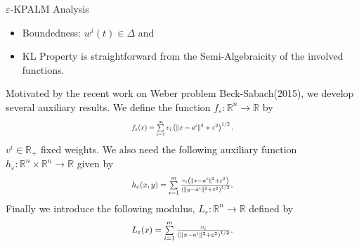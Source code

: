 \documentclass[9pt,handout]{beamer} %
\newenvironment{displaybox}[1]
{
  \centerline\bgroup\hfill
  \begin{beamerboxesrounded}[lower=default,shadow=true,width=#1]{}
}
{
  \end{beamerboxesrounded}\hfill\egroup
}
\newcommand{\rr}{\mathbb{R}} %
\begin{document}
	\begin{frame}{$\varepsilon$-KPALM Analysis}
		\begin{itemize}[<+->]
			\item Boundedness: $w^i(t) \in \Delta$ and \\
			\item KL Property is straightforward from the Semi-Algebraicity of the involved functions.
		\end{itemize}
		\pause
		\begin{displaybox}{11cm}
			Motivated by the recent work on Weber problem {\dblue Beck-Sabach(2015)}, we develop several auxiliary results. We define the function $f_{\varepsilon}: \mathbb{R}^n \rightarrow \mathbb{R}$ by
			\begin{equation*}
				\resizebox{.3\hsize}{!}{$f_{\varepsilon}(x) = \sum\limits_{i=1}^{m} v_i \left( \|x - a^i\|^2 + {\varepsilon}^2 \right)^{1/2},$}
			\end{equation*}
			$v^i \in \rr_+$ fixed weights. We also need the following auxiliary function $h_{\varepsilon}: \mathbb{R}^n \times \mathbb{R}^n \rightarrow \mathbb{R}$ given by
			\begin{equation*}
				\resizebox{.3\hsize}{!}{$h_{\varepsilon}(x,y) = \sum\limits_{i=1}^m \frac{v_i \left( \|x-a^i\|^2 + {\varepsilon}^2 \right)}{\left( \|y-a^i\|^2 + {\varepsilon}^2 \right)^{1/2}}.$}
			\end{equation*}
			Finally we introduce the following modulus, $L_{\varepsilon}: \mathbb{R}^n \rightarrow \mathbb{R}$ defined by
			\begin{equation*}
				\resizebox{.3\hsize}{!}{$L_{\varepsilon}(x) = \sum\limits_{i=1}^{m}\frac{v_i}{\left( \|x - a^i\|^2 + {\varepsilon}^2 \right)^{1/2}}.$}
			\end{equation*}
		\end{displaybox}
	\end{frame}
	
\end{document}
